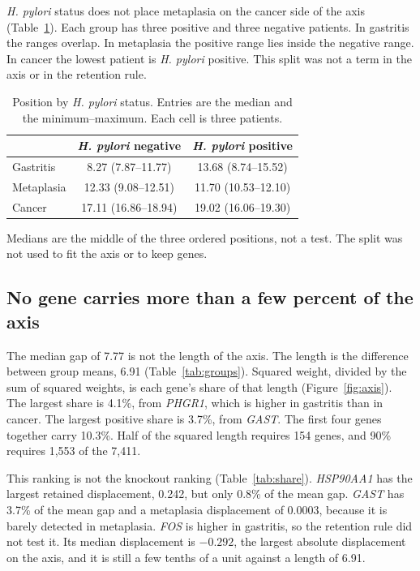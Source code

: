 \documentclass[11pt,a4paper]{article}
\begin{document}
\textit{H. pylori} status does not place metaplasia on the cancer side of the axis (Table~\ref{tab:hp}). Each group has three positive and three negative patients. In gastritis the ranges overlap. In metaplasia the positive range lies inside the negative range. In cancer the lowest patient is \textit{H. pylori} positive. This split was not a term in the axis or in the retention rule.

\begin{table}[htbp]
  \centering
  \caption{Position by \textit{H. pylori} status. Entries are the median and the minimum--maximum. Each cell is three patients.}
  \label{tab:hp}
  \small
  \begin{tabular}{lcc}
    \toprule
     & \textit{H. pylori} negative & \textit{H. pylori} positive \\
    \midrule
    Gastritis & 8.27 (7.87--11.77) & 13.68 (8.74--15.52) \\
    Metaplasia & 12.33 (9.08--12.51) & 11.70 (10.53--12.10) \\
    Cancer & 17.11 (16.86--18.94) & 19.02 (16.06--19.30) \\
    \bottomrule
  \end{tabular}
  \par\vspace{0.35em}
  {\raggedright\footnotesize Medians are the middle of the three ordered positions, not a test. The split was not used to fit the axis or to keep genes.\par}
\end{table}

\subsection{No gene carries more than a few percent of the axis}

The median gap of 7.77 is not the length of the axis. The length is the difference between group means, 6.91 (Table~\ref{tab:groups}). Squared weight, divided by the sum of squared weights, is each gene's share of that length (Figure~\ref{fig:axis}). The largest share is 4.1\%, from \textit{PHGR1}, which is higher in gastritis than in cancer. The largest positive share is 3.7\%, from \textit{GAST}. The first four genes together carry 10.3\%. Half of the squared length requires 154 genes, and 90\% requires 1{,}553 of the 7{,}411.

This ranking is not the knockout ranking (Table~\ref{tab:share}). \textit{HSP90AA1} has the largest retained displacement, 0.242, but only 0.8\% of the mean gap. \textit{GAST} has 3.7\% of the mean gap and a metaplasia displacement of 0.0003, because it is barely detected in metaplasia. \textit{FOS} is higher in gastritis, so the retention rule did not test it. Its median displacement is $-0.292$, the largest absolute displacement on the axis, and it is still a few tenths of a unit against a length of 6.91.
\end{document}
